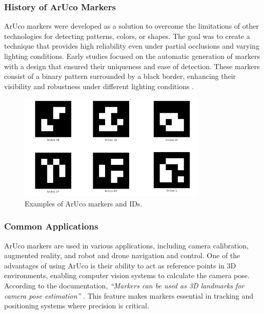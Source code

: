     \subsubsection{History of ArUco Markers}

    ArUco markers were developed as a solution to overcome the limitations of other technologies for detecting patterns, colors, or shapes. The goal was to create a technique that provides high reliability even under partial occlusions and varying lighting conditions. Early studies focused on the automatic generation of markers with a design that ensured their uniqueness and ease of detection. These markers consist of a binary pattern surrounded by a black border, enhancing their visibility and robustness under different lighting conditions \cite{aruco_docs}.

    \begin{figure}[h!] 
        \centering 
        \includegraphics[width=0.8\textwidth]{pictures/arucos_ids.png} %
        \caption{Examples of ArUco markers and IDs.} 
        \label{fig} 
    \end{figure}

    \subsubsection{Common Applications}

    ArUco markers are used in various applications, including camera calibration, augmented reality, and robot and drone navigation and control. One of the advantages of using ArUco is their ability to act as reference points in 3D environments, enabling computer vision systems to calculate the camera pose. According to the documentation, \textit{“Markers can be used as 3D landmarks for camera pose estimation”} \cite{aruco_docs_pdf}. This feature makes markers essential in tracking and positioning systems where precision is critical.

